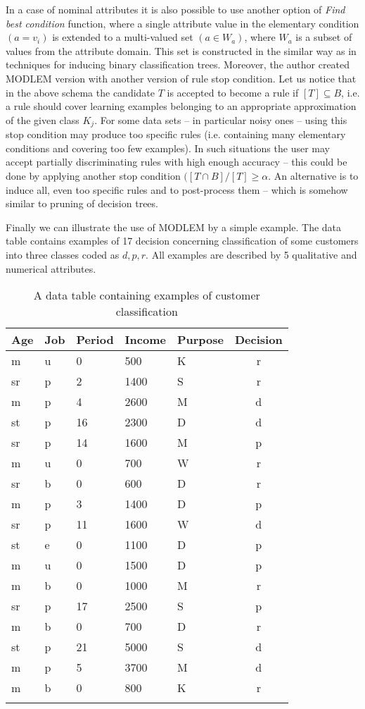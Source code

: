 \documentclass{llncs}
\begin{document}
In a case of nominal attributes it is also possible to use another option of
{\em Find best condition} function, where a single attribute value in the
elementary condition $(a = v_i)$ is extended to a multi-valued set $(a \in
W_a)$, where $W_a$ is a subset of values from the attribute domain. This set
is constructed in the similar way as in techniques for inducing binary
classification trees. Moreover, the author created MODLEM version with
another version of rule stop condition. Let us notice that in the above
schema the candidate $T$ is accepted to become a rule if $[T]\subseteq B$,
i.e. a rule should cover learning examples belonging to an appropriate
approximation of the given class $K_j$. For some data sets -- in particular
noisy ones -- using this stop condition may produce too specific rules (i.e.
containing many elementary conditions and covering too few examples). In
such situations the user may accept partially discriminating rules with high
enough accuracy -- this could be done by applying another stop condition
$([T \cap B]/[T] \geq \alpha$. An alternative is to induce all, even too
specific rules and to post-process them -- which is somehow similar to
pruning of decision trees.

Finally we can illustrate the use of MODLEM by a simple example. The data
table contains examples of 17 decision concerning classification of some
customers into three classes coded as $d,p,r$. All examples are described by
5 qualitative and numerical attributes.

\begin{table}
\label{customers} \centering \caption{A data table containing examples of
customer classification}
\begin{tabular}{lllllc}
\hline\noalign{\smallskip}
 Age &  Job & Period & Income & Purpose & Decision
\\
 \hline\noalign{\smallskip}
m & u & 0 & 500 & K &  r\\
sr & p & 2 & 1400 & S & r\\
m & p & 4 & 2600 & M & d \\
st & p & 16 & 2300 & D & d \\
sr & p & 14 & 1600 & M & p\\
 m & u & 0 & 700 & W & r \\
sr & b & 0 & 600 & D & r \\
m & p & 3 & 1400 & D & p \\
sr & p & 11 & 1600 & W & d \\
st & e & 0 & 1100 & D & p \\
m & u & 0 & 1500 & D & p \\
m & b & 0 & 1000 & M & r \\
sr & p & 17 & 2500 & S & p \\
m & b & 0 & 700 & D & r \\
st & p & 21 & 5000 & S & d\\
m & p & 5 & 3700 & M & d\\
m & b & 0 & 800 & K & r\\
 \noalign{\smallskip}
 \hline
\end{tabular}
\end{table}
\end{document}
